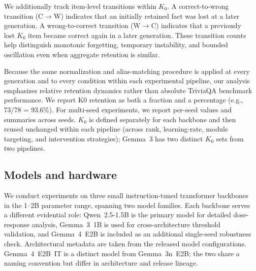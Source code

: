 \documentclass[a4paper,fleqn]{cas-dc}
\newif\ifshowchanges
\newcommand{\rev}[1]{\ifshowchanges{\color{blue}#1}\else{#1}\fi}
\begin{document}
We additionally track item-level transitions within $K_0$. A
correct-to-wrong transition (C$\to$W) indicates that an initially retained fact
was lost at a later generation. A wrong-to-correct transition (W$\to$C)
indicates that a previously lost $K_0$ item became correct again in a later
generation. These transition counts help distinguish monotonic forgetting,
temporary instability, and bounded oscillation even when aggregate retention is
similar.

Because the same normalization and alias-matching procedure is applied at every
generation and to \rev{every condition within each experimental pipeline}, our analysis emphasizes
relative retention dynamics rather than absolute TriviaQA benchmark performance.
We report K0 retention as both a fraction and a percentage (e.g.,
73/78 = 93.6\%). For multi-seed experiments, we report per-seed values and
summaries across seeds. $K_0$ is defined separately
for each backbone and then \rev{reused unchanged within each pipeline (across rank, learning-rate, module
targeting, and intervention strategies); Gemma~3 has two distinct $K_0$ sets from two pipelines.}

\subsection{Models and hardware}\label{sec:models}

We conduct experiments on three small instruction-tuned transformer backbones in
the 1--2B parameter range, spanning two model families. Each backbone serves a
different evidential role: Qwen~2.5-1.5B is the primary model for detailed
dose-response analysis, Gemma~3~1B is used for cross-architecture threshold
validation, and Gemma~4~E2B is included as an additional single-seed robustness
check. Architectural metadata are taken from the released model configurations.
\rev{Gemma~4~E2B~IT is a distinct model from Gemma~3n~E2B; the two share a naming convention but differ in architecture and release lineage.}
\end{document}
